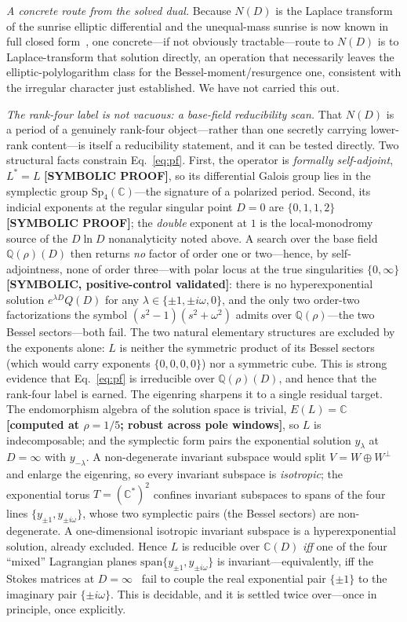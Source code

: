 \documentclass[aps,pra,twocolumn,superscriptaddress,longbibliography]{revtex4-2}
\begin{document}
\emph{A concrete route from the solved dual.}  Because $N(D)$ is the Laplace
transform of the sunrise elliptic differential and the unequal-mass sunrise is
now known in full closed form~\cite{bognermsw2019}, one concrete---if not
obviously tractable---route to $N(D)$ is to Laplace-transform that solution
directly, an operation that necessarily leaves the elliptic-polylogarithm class
for the Bessel-moment/resurgence one, consistent with the irregular character
just established.  We have not carried this out.

\emph{The rank-four label is not vacuous: a base-field reducibility scan.}
That $N(D)$ is a period of a genuinely rank-four object---rather than one
secretly carrying lower-rank content---is itself a reducibility statement, and
it can be tested directly.  Two structural facts constrain
Eq.~\eqref{eq:pf}.  First, the operator is \emph{formally self-adjoint},
$L^{*}=L$ \textbf{[SYMBOLIC PROOF]}, so its differential Galois group lies in
the symplectic group $\mathrm{Sp}_{4}(\mathbb{C})$---the signature of a
polarized period.  Second, its indicial exponents at the regular singular point
$D=0$ are $\{0,1,1,2\}$ \textbf{[SYMBOLIC PROOF]}; the \emph{double} exponent at
$1$ is the local-monodromy source of the $D\ln D$ nonanalyticity noted above.
A search over the base field $\mathbb{Q}(\rho)(D)$ then returns \emph{no} factor
of order one or two---hence, by self-adjointness, none of order three---with
polar locus at the true singularities $\{0,\infty\}$
\textbf{[SYMBOLIC, positive-control validated]}: there is no hyperexponential
solution $e^{\lambda D}Q(D)$ for any $\lambda\in\{\pm1,\pm i\omega,0\}$, and the
only two order-two factorizations the symbol $(s^{2}-1)(s^{2}+\omega^{2})$
admits over $\mathbb{Q}(\rho)$---the two Bessel sectors---both fail.  The two
natural elementary structures are excluded by the exponents alone: $L$ is
neither the symmetric product of its Bessel sectors (which would carry exponents
$\{0,0,0,0\}$) nor a symmetric cube.  This is strong evidence
that Eq.~\eqref{eq:pf} is irreducible over $\mathbb{Q}(\rho)(D)$, and hence that
the rank-four label is earned.  The eigenring sharpens it to a single residual
target.  The endomorphism algebra of the solution space is trivial,
$E(L)=\mathbb{C}$ \textbf{[computed at $\rho=1/5$; robust across pole windows]}, so
$L$ is indecomposable; and the symplectic form pairs the exponential solution
$y_{\lambda}$ at $D=\infty$ with $y_{-\lambda}$.  A non-degenerate invariant
subspace would split $V=W\oplus W^{\perp}$ and enlarge the eigenring, so every
invariant subspace is \emph{isotropic}; the exponential torus $T=(\mathbb{C}^{*})^{2}$
confines invariant subspaces to spans of the four lines
$\{y_{\pm1},y_{\pm i\omega}\}$, whose two symplectic pairs (the Bessel sectors)
are non-degenerate.  A one-dimensional isotropic invariant subspace is a
hyperexponential solution, already excluded.  Hence $L$ is
reducible over $\mathbb{C}(D)$ \emph{iff} one of the four ``mixed'' Lagrangian
planes $\mathrm{span}\{y_{\pm1},y_{\pm i\omega}\}$ is invariant---equivalently,
iff the Stokes matrices at $D=\infty$~\cite{sabbah_stokes2013} fail to couple the real
exponential pair $\{\pm1\}$ to the imaginary pair $\{\pm i\omega\}$.  This is
decidable, and it is settled twice over---once in principle, once explicitly.
\end{document}
